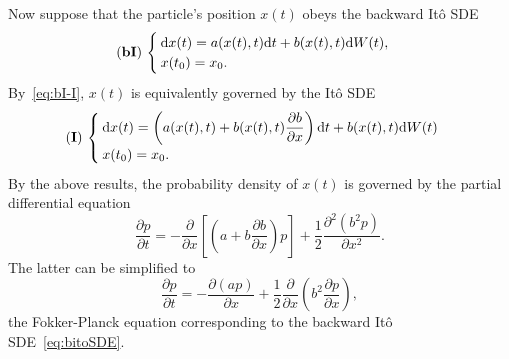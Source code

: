Now suppose that the particle's position $x(t)$ obeys the backward Itô SDE
\begin{equation} \label{eq:bitoSDE}
	\bI\ 
	\begin{cases}
		\rm dx(t) = a(x(t),t) \rm dt + b(x(t),t) \rm dW(t),\\
		x(t_0) = x_0. 
	\end{cases}
\end{equation}
By~\eqref{eq:bI-I}, $x(t)$ is equivalently governed by the Itô SDE
\begin{equation} \label{eq:biSDE-i}
	\I\ 
	\begin{cases}
		\rm dx(t) = \left(a(x(t),t)+b(x(t),t)\dfrac{\partial b}{\partial x}\right)\rm dt + b(x(t),t) \rm dW(t)\\
		x(t_0) = x_0. 
	\end{cases}
\end{equation}
By the above results, the probability density of $x(t)$ is governed by the partial differential equation
\begin{equation}
	\frac{\partial p}{\partial t} = - \frac{\partial}{\partial x}\left[\left(a+b\dfrac{\partial b}{\partial x}\right)p\right] + \frac{1}{2}\frac{\partial^2 (b^2 p)}{\partial x^2}.
\end{equation}
The latter can be simplified to
\begin{equation}
	\frac{\partial p}{\partial t} = - \frac{\partial(ap)}{\partial x} + \frac{1}{2}\frac{\partial}{\partial x}\left(b^2 \frac{\partial p}{\partial x} \right),
\end{equation}
the Fokker-Planck equation corresponding to the backward Itô SDE~\eqref{eq:bitoSDE}.

